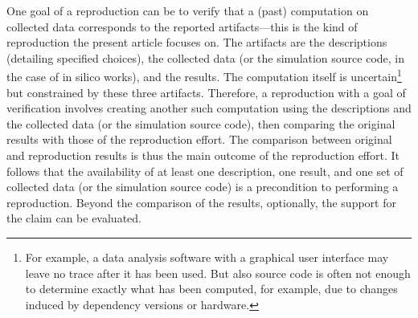 \documentclass[authordate, meta]{jote-new-article}
\begin{document}
	One goal of a reproduction can be to verify that a (past) computation on collected data corresponds to the reported artifacts—this is the kind of reproduction the present article focuses on. The artifacts are the descriptions (detailing specified choices), the collected data (or the simulation source code, in the case of in silico works), and the results. The computation itself is uncertain\footnote{ For example, a data analysis software with a graphical user interface may leave no trace after it has been used. But also source code is often not enough to determine exactly what has been computed, for example, due to changes induced by dependency versions or hardware.} but constrained by these three artifacts. Therefore, a reproduction with a goal of verification involves creating another such computation using the descriptions and the collected data (or the simulation source code), then comparing the original results with those of the reproduction effort. The comparison between original and reproduction results is thus the main outcome of the reproduction effort. It follows that the availability of at least one description, one result, and one set of collected data (or the simulation source code) is a precondition to performing a reproduction. Beyond the comparison of the results, optionally, the support for the claim can be evaluated.
\end{document}
